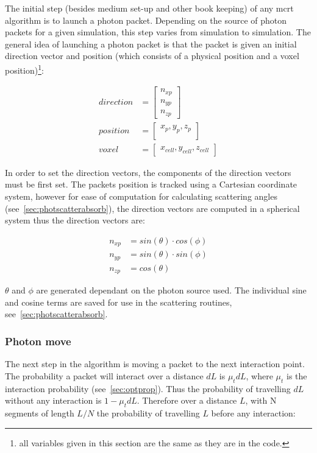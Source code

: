 The initial step (besides medium set-up and other book keeping) of any \gls{mcrt} algorithm is to launch a photon packet. Depending on the source of photon packets for a given simulation, this step varies from simulation to simulation. The general idea of launching a photon packet is that the packet is given an initial direction vector and position (which consists of a physical position and a voxel position)\footnote{all variables given in this section are the same as they are in the code.}:

\begin{align}
	direction &= \begin{bmatrix}
		n_{xp}\\
		n_{yp}\\
		n_{zp}
	\end{bmatrix}\\
	position &= \begin{bmatrix}
		x_p, y_p, z_p\\
	\end{bmatrix}\\
	voxel &= \begin{bmatrix}
		x_{cell}, y_{cell}, z_{cell}
	\end{bmatrix}	 
\end{align}

In order to set the direction vectors, the components of the direction vectors must be first set. The packets position is tracked using a Cartesian coordinate system, however for ease of computation for calculating scattering angles (see~\cref{sec:photscatterabsorb}), the direction vectors are computed in a spherical system thus the direction vectors are: 

\begin{align}
n_{xp} &= sin(\theta) \cdot cos(\phi) \\
n_{yp} &= sin(\theta) \cdot sin(\phi) \\
n_{zp} &= cos(\theta)
\end{align}

$\theta$ and $\phi$ are generated dependant on the photon source used. The individual sine and cosine terms are saved for use in the scattering routines, see~\cref{sec:photscatterabsorb}.

\subsubsection{Photon move}\label{sec:photmove}

The next step in the algorithm is moving a packet to the next interaction point. The probability a packet will interact over a distance $dL$ is $\mu_tdL$, where $\mu_t$ is the interaction probability (see~\cref{sec:optprop}). Thus the probability of travelling $dL$ without any interaction is $1-\mu_tdL$. Therefore over a distance $L$, with N segments of length $L/N$ the probability of travelling $L$ before any interaction:

